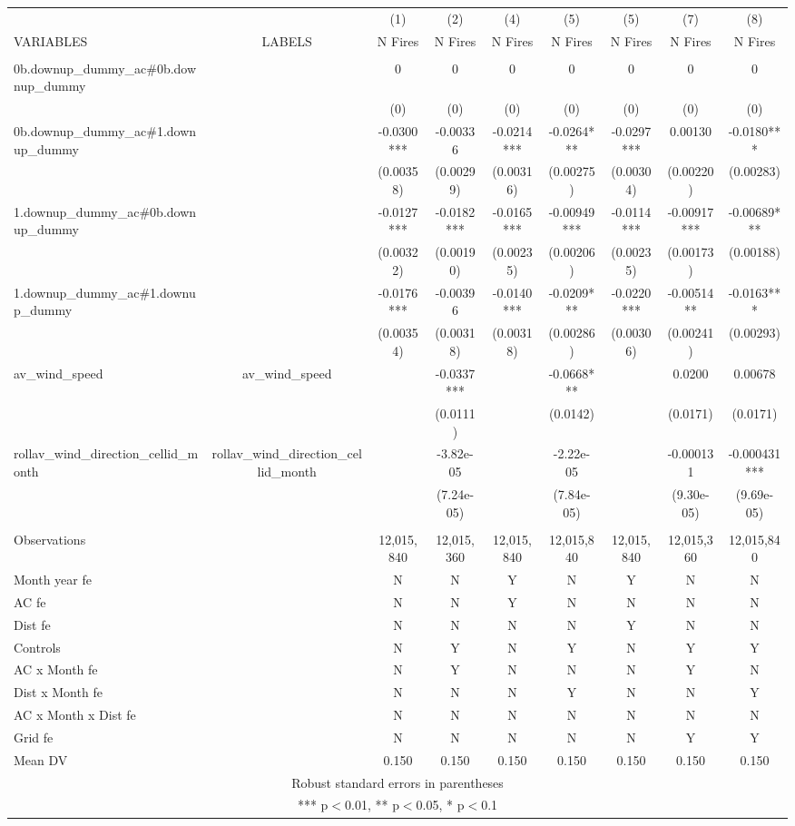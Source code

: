 \documentclass[]{article}
\begin{document}
\begin{tabular}{lcccccccc} \hline
 &  & (1) & (2) & (4) & (5) & (5) & (7) & (8) \\
VARIABLES & LABELS & N Fires & N Fires & N Fires & N Fires & N Fires & N Fires & N Fires \\ \hline
 &  &  &  &  &  &  &  &  \\
0b.downup\_dummy\_ac\#0b.downup\_dummy &  & 0 & 0 & 0 & 0 & 0 & 0 & 0 \\
 &  & (0) & (0) & (0) & (0) & (0) & (0) & (0) \\
0b.downup\_dummy\_ac\#1.downup\_dummy &  & -0.0300*** & -0.00336 & -0.0214*** & -0.0264*** & -0.0297*** & 0.00130 & -0.0180*** \\
 &  & (0.00358) & (0.00299) & (0.00316) & (0.00275) & (0.00304) & (0.00220) & (0.00283) \\
1.downup\_dummy\_ac\#0b.downup\_dummy &  & -0.0127*** & -0.0182*** & -0.0165*** & -0.00949*** & -0.0114*** & -0.00917*** & -0.00689*** \\
 &  & (0.00322) & (0.00190) & (0.00235) & (0.00206) & (0.00235) & (0.00173) & (0.00188) \\
1.downup\_dummy\_ac\#1.downup\_dummy &  & -0.0176*** & -0.00396 & -0.0140*** & -0.0209*** & -0.0220*** & -0.00514** & -0.0163*** \\
 &  & (0.00354) & (0.00318) & (0.00318) & (0.00286) & (0.00306) & (0.00241) & (0.00293) \\
av\_wind\_speed & av\_wind\_speed &  & -0.0337*** &  & -0.0668*** &  & 0.0200 & 0.00678 \\
 &  &  & (0.0111) &  & (0.0142) &  & (0.0171) & (0.0171) \\
rollav\_wind\_direction\_cellid\_month & rollav\_wind\_direction\_cellid\_month &  & -3.82e-05 &  & -2.22e-05 &  & -0.000131 & -0.000431*** \\
 &  &  & (7.24e-05) &  & (7.84e-05) &  & (9.30e-05) & (9.69e-05) \\
 &  &  &  &  &  &  &  &  \\
Observations &  & 12,015,840 & 12,015,360 & 12,015,840 & 12,015,840 & 12,015,840 & 12,015,360 & 12,015,840 \\
Month year fe &  & N & N & Y & N & Y & N & N \\
AC fe &  & N & N & Y & N & N & N & N \\
Dist fe &  & N & N & N & N & Y & N & N \\
Controls &  & N & Y & N & Y & N & Y & Y \\
AC x Month fe &  & N & Y & N & N & N & Y & N \\
Dist x Month fe &  & N & N & N & Y & N & N & Y \\
AC x Month x Dist fe &  & N & N & N & N & N & N & N \\
Grid fe &  & N & N & N & N & N & Y & Y \\
 Mean DV &  & 0.150 & 0.150 & 0.150 & 0.150 & 0.150 & 0.150 & 0.150 \\ \hline
\multicolumn{9}{c}{ Robust standard errors in parentheses} \\
\multicolumn{9}{c}{ *** p$<$0.01, ** p$<$0.05, * p$<$0.1} \\
\end{tabular}
\end{document}

